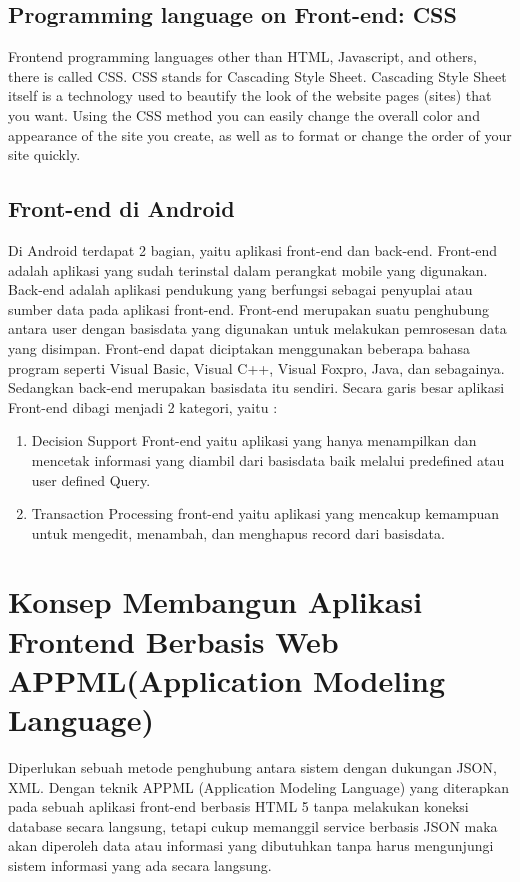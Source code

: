 \subsection{Programming language on Front-end: CSS }
Frontend programming languages other than HTML, Javascript, and others, there is called CSS. CSS stands for Cascading Style Sheet. Cascading Style Sheet itself is a technology used to beautify 
the look of the website pages (sites) that you want. Using the CSS method you can easily change the overall color and appearance of the site you create, as well as to format or change the order of your site quickly\cite{poetra2003tutorial}.
\subsection{Front-end di Android}
Di Android terdapat 2 bagian, yaitu aplikasi front-end dan back-end. Front-end adalah aplikasi yang sudah terinstal dalam perangkat mobile yang digunakan.
Back-end adalah aplikasi pendukung yang berfungsi sebagai penyuplai atau sumber data pada aplikasi front-end. Front-end merupakan suatu penghubung
antara user dengan basisdata yang digunakan untuk melakukan pemrosesan data yang disimpan. Front-end dapat diciptakan menggunakan 
beberapa bahasa program seperti Visual Basic, Visual C++, Visual Foxpro, Java, dan sebagainya. Sedangkan back-end merupakan basisdata itu sendiri.
 Secara garis besar aplikasi Front-end dibagi menjadi 2 kategori, yaitu :
\begin{enumerate}
\item Decision Support Front-end yaitu aplikasi yang hanya menampilkan  dan mencetak informasi yang diambil dari basisdata baik melalui predefined atau user defined Query.
\item  Transaction Processing front-end yaitu aplikasi yang mencakup kemampuan untuk mengedit, menambah, dan menghapus record dari basisdata\cite{nuari2014perancangan}.
\end{enumerate}
\section{Konsep Membangun Aplikasi Frontend Berbasis Web APPML(Application Modeling Language) }
Diperlukan sebuah metode penghubung antara sistem dengan dukungan JSON, XML. Dengan teknik APPML (Application Modeling Language) yang diterapkan pada sebuah aplikasi front-end berbasis HTML 5 tanpa melakukan koneksi database secara langsung, tetapi cukup memanggil service berbasis JSON maka akan diperoleh data atau informasi yang dibutuhkan tanpa harus mengunjungi sistem informasi yang ada secara langsung\cite{triyono2017konsep}.

